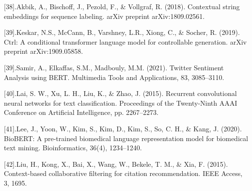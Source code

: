 \documentclass[journal]{IEEEtran}
\begin{document}
[38].Akbik, A., Bischoff, J., Pezold, F., & Vollgraf, R. (2018). Contextual string embeddings for sequence labeling. arXiv preprint arXiv:1809.02561.

[39].Keskar, N.S., McCann, B., Varshney, L.R., Xiong, C., & Socher, R. (2019). Ctrl: A conditional transformer language model for controllable generation. arXiv preprint arXiv:1909.05858.


[39].Samir, A., Elkaffas, S.M., Madbouly, M.M. (2021). Twitter Sentiment Analysis using BERT. Multimedia Tools and Applications, 83, 3085–3110.


[40].Lai, S. W., Xu, L. H., Liu, K., & Zhao, J. (2015). Recurrent convolutional neural networks for text classification. Proceedings of the Twenty-Ninth AAAI Conference on Artificial Intelligence, pp. 2267–2273.

[41].Lee, J., Yoon, W., Kim, S., Kim, D., Kim, S., So, C. H., & Kang, J. (2020). BioBERT: A pre-trained biomedical language representation model for biomedical text mining. Bioinformatics, 36(4), 1234–1240.

[42].Liu, H., Kong, X., Bai, X., Wang, W., Bekele, T. M., & Xia, F. (2015). Context-based collaborative filtering for citation recommendation. IEEE Access, 3, 1695.
\end{document}
